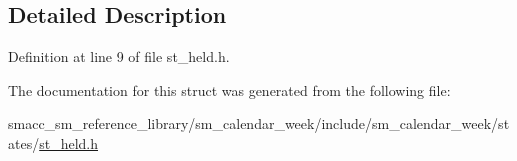 \subsection{Detailed Description}


Definition at line 9 of file st\+\_\+held.\+h.



The documentation for this struct was generated from the following file\+:\begin{DoxyCompactItemize}
\item 
smacc\+\_\+sm\+\_\+reference\+\_\+library/sm\+\_\+calendar\+\_\+week/include/sm\+\_\+calendar\+\_\+week/states/\hyperlink{sm__calendar__week_2include_2sm__calendar__week_2states_2st__held_8h}{st\+\_\+held.\+h}\end{DoxyCompactItemize}
